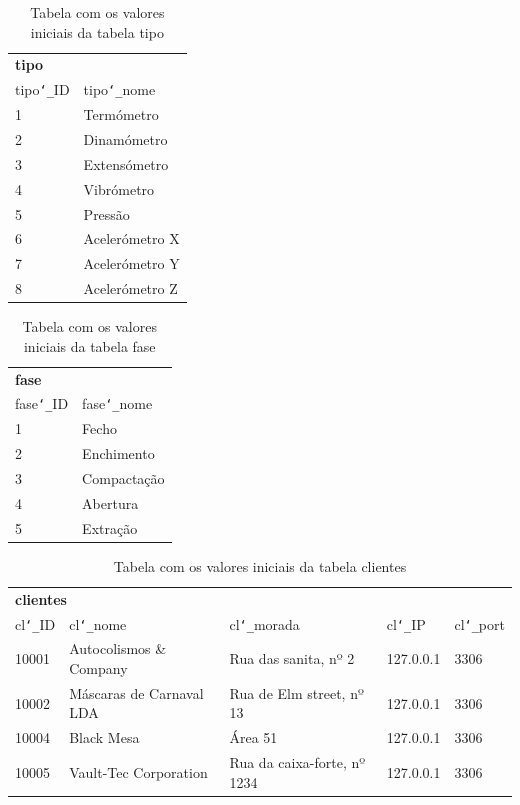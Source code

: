 \documentclass[11pt,twoside,a4paper]{report}
\begin{document}
\begin{table}[H]
	\centering
	\begin{tabular}{|l|l|}
		\multicolumn{2}{l}{\textbf{tipo}}\\ \cline{1-2}
		tipo\texttt{\char`_}ID & tipo\texttt{\char`_}nome\\ \cline{1-2}
		1 & Termómetro\\ \cline{1-2}
		2 & Dinamómetro\\ \cline{1-2}
		3 & Extensómetro\\ \cline{1-2}
		4 & Vibrómetro\\ \cline{1-2}
		5 & Pressão\\ \cline{1-2}
		6 & Acelerómetro X\\ \cline{1-2}
		7 & Acelerómetro Y\\ \cline{1-2}
		8 & Acelerómetro Z\\ \cline{1-2}
	\end{tabular}
	\caption[Tabela com os valores iniciais da tabela tipo]{Tabela com os valores iniciais da tabela tipo}
	\label{tab:dados1}
\end{table}
\begin{table}[H]
	\centering
	\begin{tabular}{|l|l|}
		\multicolumn{2}{l}{\textbf{fase}}\\ \cline{1-2}
		fase\texttt{\char`_}ID & fase\texttt{\char`_}nome\\ \cline{1-2}
		1 & Fecho\\ \cline{1-2}
		2 & Enchimento\\ \cline{1-2}
		3 & Compactação\\ \cline{1-2}
		4 & Abertura\\ \cline{1-2}
		5 & Extração\\ \cline{1-2}
	\end{tabular}
	\caption[Tabela com os valores iniciais da tabela fase]{Tabela com os valores iniciais da tabela fase}
	\label{tab:dados2}
\end{table}
\begin{table}[H]
	\centering
	\begin{tabular}{|l|l|l|l|l|}
		\multicolumn{5}{l}{\textbf{clientes}}\\ \cline{1-5}
		cl\texttt{\char`_}ID & cl\texttt{\char`_}nome & cl\texttt{\char`_}morada & cl\texttt{\char`_}IP & cl\texttt{\char`_}port\\ \cline{1-5}
		10001 & Autocolismos \& Company & Rua das sanita, nº 2 & 127.0.0.1 & 3306\\ \cline{1-5}
		10002 & Máscaras de Carnaval LDA & Rua de Elm street, nº 13 & 127.0.0.1 & 3306\\ \cline{1-5}
		10004 & Black Mesa & Área 51 & 127.0.0.1 & 3306\\ \cline{1-5}
		10005 & Vault-Tec Corporation & Rua da caixa-forte, nº 1234 & 127.0.0.1 & 3306\\ \cline{1-5}
	\end{tabular}
	\caption[Tabela com os valores iniciais da tabela clientes]{Tabela com os valores iniciais da tabela clientes}
	\label{tab:dados3}
\end{table}
\end{document}
